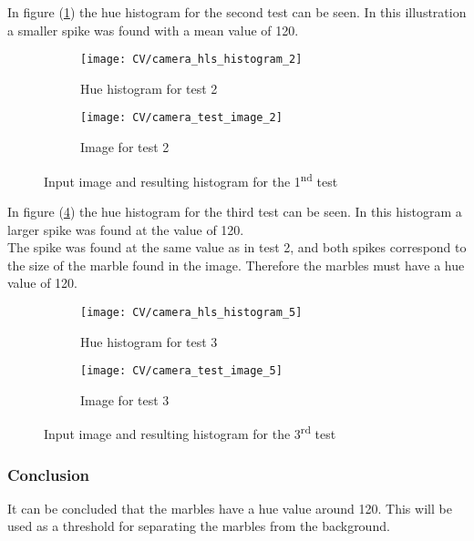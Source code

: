\documentclass[../Head/Main.tex]{subfiles}
\begin{document}
In figure (\ref{fig:hist_test_2}) the hue histogram for the second test can be seen. In this illustration a smaller spike was found with a mean value of 120.
\begin{figure}[H]
	\centering
	\begin{subfigure}[b]{0.48\textwidth}
		\centering
		\texttt{[image: CV/camera\_hls\_histogram\_2]}
		\caption{Hue histogram for test 2}
		\label{fig:hist_test_2}
	\end{subfigure}
	\hfill
	\begin{subfigure}[b]{0.5\textwidth}
		\centering
		\texttt{[image: CV/camera\_test\_image\_2]}
		\caption{Image for test 2}
		\label{fig:image_test_2}
	\end{subfigure}
	\caption{Input image and resulting histogram for the 1\textsuperscript{nd} test}
	\label{fig:test_2}
\end{figure}

In figure (\ref{fig:hist_test_3}) the hue histogram for the third test can be seen. In this histogram a larger spike was found at the value of 120.\\
The spike was found at the same value as in test 2, and both spikes correspond to the size of the marble found in the image. Therefore the marbles must have a hue value of 120.
\begin{figure}[H]
	\centering
	\begin{subfigure}[b]{0.48\textwidth}
		\centering
		\texttt{[image: CV/camera\_hls\_histogram\_5]}
		\caption{Hue histogram for test 3}
		\label{fig:hist_test_3}
	\end{subfigure}
	\hfill
	\begin{subfigure}[b]{0.5\textwidth}
		\centering

		\texttt{[image: CV/camera\_test\_image\_5]}
		\caption{Image for test 3}
		\label{fig:image_test_3}
	\end{subfigure}
	\caption{Input image and resulting histogram for the 3\textsuperscript{rd} test}
	\label{fig:test_3}
\end{figure}


\subsubsection*{Conclusion}

It can be concluded that the marbles have a hue value around 120. This will be used as a threshold for separating the marbles from the background.
\end{document}
